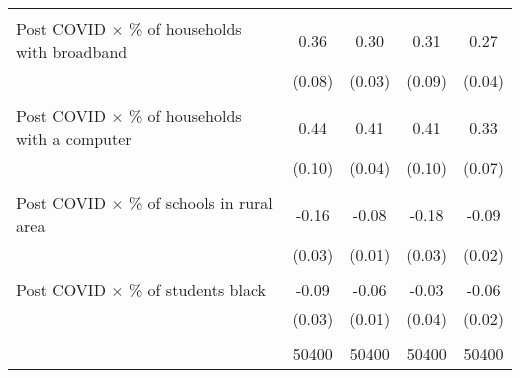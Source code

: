 \begin{table}[htbp]
{\begin{tabular*}{1\textwidth}{@{\extracolsep{\fill}}l*{4}{c}}
                    &                     &                     &                     &                     \\
Post COVID $\times$ \% of households with broadband&        0.36\sym{***}&        0.30\sym{***}&        0.31\sym{***}&        0.27\sym{***}\\
                    &      (0.08)         &      (0.03)         &      (0.09)         &      (0.04)         \\
                    &                     &                     &                     &                     \\
Post COVID $\times$ \% of households with a computer&        0.44\sym{***}&        0.41\sym{***}&        0.41\sym{***}&        0.33\sym{***}\\
                    &      (0.10)         &      (0.04)         &      (0.10)         &      (0.07)         \\
                    &                     &                     &                     &                     \\
Post COVID $\times$ \% of schools in rural area&       -0.16\sym{***}&       -0.08\sym{***}&       -0.18\sym{***}&       -0.09\sym{***}\\
                    &      (0.03)         &      (0.01)         &      (0.03)         &      (0.02)         \\
                    &                     &                     &                     &                     \\
Post COVID $\times$ \% of students black&       -0.09\sym{***}&       -0.06\sym{***}&       -0.03         &       -0.06\sym{***}\\
                    &      (0.03)         &      (0.01)         &      (0.04)         &      (0.02)         \\
                    &                     &                     &                     &                     \\
\hline
& 50400 & 50400 & 50400 & 50400
\end{tabular*}
}
\end{table}

